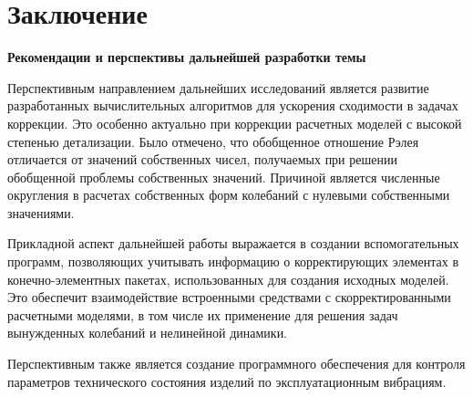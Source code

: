 
\chapter*{Заключение} 



\textbf{Рекомендации и перспективы дальнейшей разработки темы}

Перспективным направлением дальнейших исследований является развитие разработанных вычислительных алгоритмов для ускорения сходимости в задачах коррекции. Это особенно актуально при коррекции расчетных моделей с высокой степенью детализации. Было отмечено, что обобщенное отношение Рэлея отличается от значений собственных чисел, получаемых при решении обобщенной проблемы собственных значений. Причиной является численные округления в расчетах собственных форм колебаний с нулевыми собственными значениями.

Прикладной аспект дальнейшей работы выражается в создании вспомогательных программ, позволяющих учитывать информацию о корректирующих элементах в конечно-элементных пакетах, использованных для создания исходных моделей. Это обеспечит взаимодействие встроенными средствами с скорректированными расчетными моделями, в том числе их применение для решения задач вынужденных колебаний и нелинейной динамики.

Перспективным также является создание программного обеспечения для контроля параметров технического состояния изделий по эксплуатационным вибрациям.
